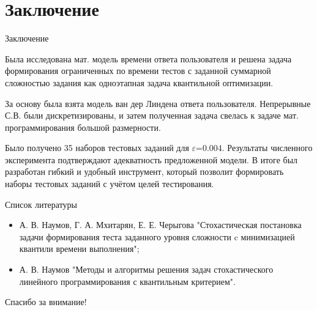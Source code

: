 \documentclass[aspectratio=169]{beamer}
\begin{document}
\section{Заключение}
\begin{frame}{Заключение}
    \small
    \begin{block}{}
    Была исследована мат. модель времени ответа пользователя и решена задача формирования ограниченных по времени тестов с заданной суммарной сложностью задания как одноэтапная задача квантильной оптимизации.
    \end{block}
    
    \begin{block}{}
    За основу была взята модель ван дер Линдена ответа пользователя. Непрерывные С.В. были дискретизированы, и затем полученная задача свелась к задаче мат. программирования большой размерности.
    \end{block}
    
    \begin{block}{}
    Было получено 35 наборов тестовых заданий для $\varepsilon$=0.004. Результаты численного эксперимента подтверждают адекватность предложенной модели. В итоге был разработан гибкий и удобный инструмент, который позволит формировать наборы тестовых заданий с учётом целей тестирования.
    \end{block}
    \normalsize
\end{frame}
    
    \begin{frame}{Список литературы}
        \begin{itemize}
  			\item А. В. Наумов, Г. А. Мхитарян, Е. Е. Черыгова "Стохастическая постановка задачи формирования теста заданного уровня сложности c минимизацией квантили времени выполнения";
  			\item А. В. Наумов "Методы и алгоритмы решения задач стохастического линейного программирования с квантильным критерием".
		\end{itemize}
    \end{frame}

    \begin{frame}
        \centering
        \huge
        Спасибо за внимание!\\
    \end{frame}
\end{document}
